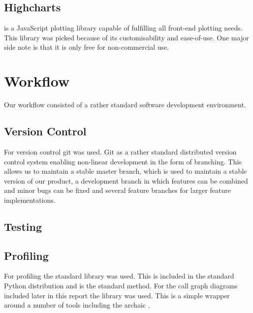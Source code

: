 \documentclass[a4paper, openany, oneside]{memoir}
\begin{document}
\subsection{Highcharts}
\label{sec:highcharts}
 is a JavaScript plotting library capable of fulfilling all front-end plotting needs. This library was picked because of its customisability and ease-of-use. One major side note is that it is only free for non-commercial use.

\section{Workflow}
\label{sec:workflow}
Our workflow consisted of a rather standard software development environment.

\subsection{Version Control}
\label{sec:version-control}
For version control git was used. Git as a rather standard distributed version control system enabling non-linear development in the form of branching. This allows us to maintain a stable master branch, which is used to maintain a stable version of our product, a development branch in which features can be combined and minor bugs can be fixed and several feature branches for larger feature implementations.

\subsection{Testing}
\label{sec:testing}


\subsection{Profiling}
\label{sec:profiling}
For profiling the standard  library was used. This is included in the standard Python distribution and is the standard method. For the call graph diagrams included later in this report the library  was used. This is a simple wrapper around a number of tools including the archaic .
\end{document}
